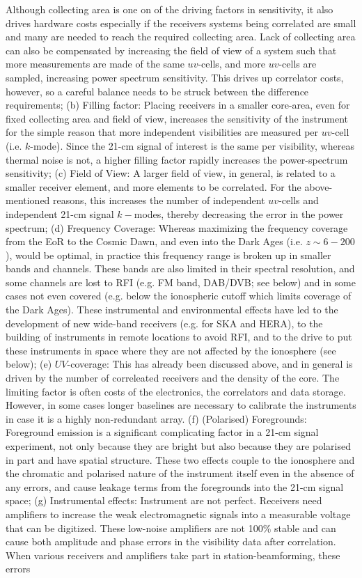  Although collecting area is one on of the driving factors in sensitivity, it also drives hardware costs especially if the receivers systems being correlated are small and many are needed to reach the required collecting area. Lack of collecting area can also be compensated by increasing the field of view of a system such that more measurements are made of the same $uv$-cells, and more $uv$-cells are sampled, increasing power spectrum sensitivity. This drives up correlator costs, however, so a careful balance needs to be struck between the difference requirements; {(b) Filling factor:} Placing receivers in a smaller core-area, even for fixed collecting area and field of view, increases the sensitivity of the instrument for the simple reason that more independent visibilities are measured per $uv$-cell (i.e. $k$-mode). Since the 21-cm signal of interest is the same per visibility, whereas thermal noise is not, a higher filling factor rapidly increases the power-spectrum sensitivity; {(c) Field of View:} A larger field of view, in general, is related to a smaller receiver element, and more elements to be correlated. For the above-mentioned reasons, this increases the number of independent $uv$-cells and independent 21-cm signal $k-$modes, thereby decreasing the error in the power spectrum; {(d) Frequency Coverage:} Whereas maximizing the frequency coverage from the EoR to the Cosmic Dawn, and even into the Dark Ages (i.e. $z\sim 6 - 200$), would be optimal, in practice this frequency range is  broken up in smaller bands and channels. These bands are also limited in their spectral resolution, and some channels are lost to RFI (e.g. FM band, DAB/DVB; see below) and in some cases not even covered (e.g. below the ionospheric cutoff which limits coverage of the Dark Ages). These instrumental and environmental effects have led to the development of new wide-band receivers (e.g. for SKA and HERA), to the building of instruments in remote locations to avoid RFI, and to the drive to put these instruments in space where they are not affected by the ionosphere (see below); {(e) $UV$-coverage:} This has already been discussed above, and in general is driven by the number of correleated receivers and the density of the core. The limiting factor is often costs of the electronics, the correlators and data storage. However, in some cases longer baselines are necessary to calibrate the instruments in case it is a highly non-redundant array. {(f) (Polarised) Foregrounds:} Foreground emission is a significant complicating factor in a 21-cm signal experiment, not only because they are bright but also because they are polarised in part and have spatial structure. These two effects couple to the ionosphere and the chromatic and polarised nature of the instrument itself even in the absence of any errors, and cause leakage terms from the foregrounds into the 21-cm signal space; {(g) Instrumental effects:} Instrument are not perfect. Receivers need amplifiers to increase the weak electromagnetic signals into a measurable voltage that can be digitized. These low-noise amplifiers are not 100\% stable and can cause both amplitude and phase errors in the visibility data after correlation. When various receivers and amplifiers take part in station-beamforming, these errors 